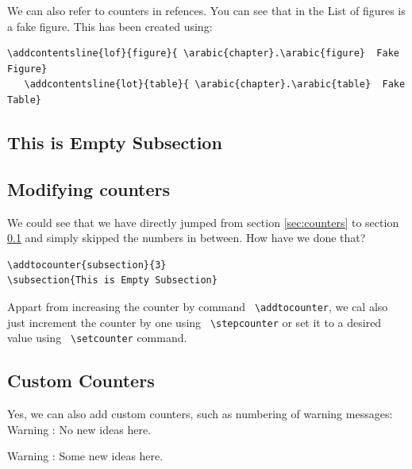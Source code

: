 \documentclass[a4paper,10pt]{report} %
\begin{document}
  We can also refer to counters in refences. You can see that in the List of figures is a fake figure. This has been created using:
  
  
   \begin{lstlisting}[language={[latex]tex}, frame=single,basicstyle=\footnotesize]
   \addcontentsline{lof}{figure}{ \arabic{chapter}.\arabic{figure}  Fake Figure}
   \addcontentsline{lot}{table}{ \arabic{chapter}.\arabic{table}  Fake Table}
\end{lstlisting}
  

\addtocounter{subsection}{3}
\subsection{This is Empty Subsection}\label{sec:empty}

\subsection{Modifying counters}

We could see that we have directly jumped from section \ref{sec:counters} to section \ref{sec:empty} and simply skipped the numbers in between.
How have we done that?
\begin{lstlisting}[language={[latex]tex},
frame=single,basicstyle=\footnotesize]
\addtocounter{subsection}{3}
\subsection{This is Empty Subsection}  
\end{lstlisting}

Appart from increasing the counter by command \texttt{ \textbackslash addtocounter}, we cal also just increment the counter by one using \texttt{ \textbackslash stepcounter} or set it to a desired value using \texttt{ \textbackslash setcounter} command. 
  
\subsection{Custom Counters}
Yes, we can also add custom counters, such as numbering of warning messages:\\

 Warning :  No new ideas here.\\
 \addtocounter{warning}{4}
 Warning :  Some new ideas here.\\
 
\end{document}

